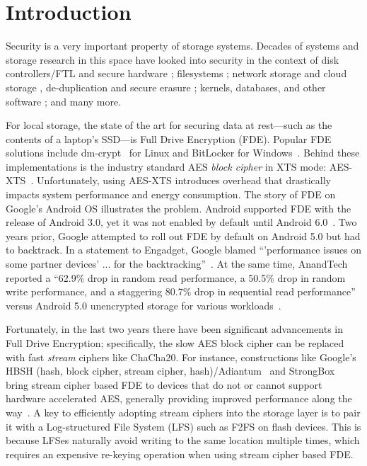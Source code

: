 \section{Introduction}\label{sec:introduction}


Security is a very important property of storage systems. Decades of systems and
storage research in this space have looked into security in the context of disk
controllers/FTL and secure hardware \cite{hardware1, hardware2, hardware3,
hardware4}; filesystems \cite{filesystems1, filesystems2, filesystems3,
filesystems4, filesystems5, filesystems6, filesystems7}; network storage and
cloud storage \cite{network1, network2, network3, network4, network5, network6,
network7, network8, network9, network10, network11, network12, network13,
network14, network15, network16}, de-duplication and secure erasure
\cite{erase1, erase2, erase3}; kernels, databases, and other software
\cite{software1, software2, software3, software4}; and many more.

For local storage, the state of the art for securing data at rest---such as the
contents of a laptop's SSD---is Full Drive Encryption (FDE). Popular FDE
solutions include dm-crypt~\cite{dmcrypt, DmC-Android} for Linux and BitLocker
for Windows~\cite{bitlocker1, bitlocker2}. Behind these implementations is the
industry standard AES \emph{block cipher} in XTS mode: AES-XTS~\cite{XTS,
XTSComments, NISTXTS}. Unfortunately, using AES-XTS introduces overhead that
drastically impacts system performance and energy consumption. The story of FDE
on Google's Android OS illustrates the problem. Android supported FDE with the
release of Android 3.0, yet it was not enabled by default until Android
6.0~\cite{android-M-mobile-motivation}. Two years prior, Google attempted to
roll out FDE by default on Android 5.0 but had to backtrack. In a statement to
Engadget, Google blamed ``'performance issues on some partner devices' ... for
the backtracking''~\cite{google-engadget}. At the same time, AnandTech reported
a ``62.9\% drop in random read performance, a 50.5\% drop in random write
performance, and a staggering 80.7\% drop in sequential read performance''
versus Android 5.0 unencrypted storage for various
workloads~\cite{android-M-mobile-motivation-2}.

Fortunately, in the last two years there have been significant advancements in
Full Drive Encryption; specifically, the slow AES block cipher can be replaced
with fast {\em stream} ciphers like ChaCha20. For instance, constructions like
Google's HBSH (hash, block cipher, stream cipher, hash)/Adiantum~\cite{Adiantum}
and StrongBox~\cite{StrongBox} bring stream cipher based FDE to devices that do
not or cannot support hardware accelerated AES, generally providing improved
performance along the way~\cite{StrongBox}. A key to efficiently adopting stream
ciphers into the storage layer is to pair it with a Log-structured File System
(LFS) such as F2FS on flash devices. This is because LFSes naturally avoid
writing to the same location multiple times, which requires an expensive
re-keying operation when using stream cipher based FDE.

